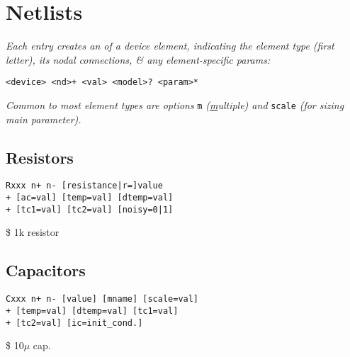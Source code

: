 \section{Netlists}

\textit{Each entry creates an  of a device element, indicating the element type (first letter), its nodal connections, \& any element-specific param\textquotesingle s:}
\begin{lstlisting}
<device> <nd>+ <val> <model>? <param>*
\end{lstlisting}
\textit{Common to most element types are options }\texttt{m}\textit{ (\underline{m}ultiple) and }\texttt{scale}\textit{ (for sizing main parameter).}

\subsection*{Resistors}
\begin{lstlisting}
Rxxx n+ n- [resistance|r=]value 
+ [ac=val] [temp=val] [dtemp=val] 
+ [tc1=val] [tc2=val] [noisy=0|1]
\end{lstlisting}

 \$ 1k resistor\\


\subsection*{Capacitors}

\begin{lstlisting}
Cxxx n+ n- [value] [mname] [scale=val] 
+ [temp=val] [dtemp=val] [tc1=val] 
+ [tc2=val] [ic=init_cond.]
\end{lstlisting}
 \$ 10$\mu$ cap. \\



